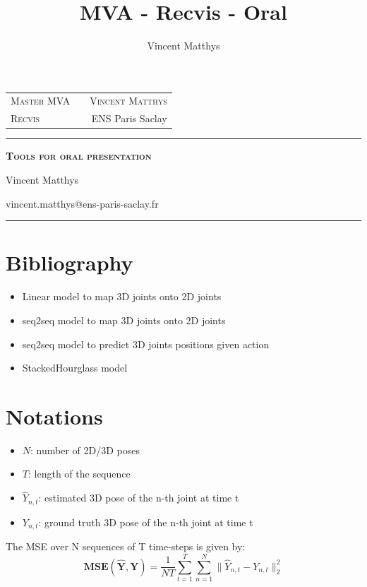 \documentclass[12pt,a4paper,onecolumn]{article}
\title{MVA - Recvis - Oral}
\author{Vincent Matthys}
\begin{document}
\begin{tabularx}{0.9\textwidth}{@{} l X r @{} }
	{\textsc{Master MVA}}  &  & \textsc{Vincent Matthys} \\
	\textsc{Recvis} &  & {ENS Paris Saclay}       \\
\end{tabularx}
\vspace{1.5cm}
\begin{center}

	\rule[11pt]{5cm}{0.5pt}

	\textbf{\LARGE \textsc{Tools for oral presentation}}
	\vspace{0.5cm}

	Vincent Matthys

	vincent.matthys@ens-paris-saclay.fr

	\rule{5cm}{0.5pt}

	\vspace{1.5cm}
\end{center}

\section{Bibliography}
\begin{itemize}
	\item Linear model to map 3D joints onto 2D joints~\cite{martinez2017simple}
	\item seq2seq model to map 3D joints onto 2D joints~\cite{hossain2017exploiting}
	\item seq2seq model to predict 3D joints positions given action~\cite{martinez2017human}
	\item StackedHourglass model~\cite{newell2016}
\end{itemize}

\section{Notations}
\begin{itemize}
	\item \(N\): number of 2D/3D poses
	\item \(T\): length of the sequence
	\item \(\widehat{Y}_{n,t}\): estimated 3D pose of the n-th joint at time t
	\item \(Y_{n,t}\): ground truth 3D pose of the n-th joint at time t
\end{itemize}



The MSE over N sequences of T time-steps is given by:
\begin{equation}
	\bm{MSE}(\widehat{\bm{Y}}, \bm{Y}) = \frac{1}{NT}\sum_{t = 1}^T\sum_{n = 1}^N \rVert \widehat{Y}_{n,t} - Y_{n,t} \lVert_2^2
\end{equation}
\end{document}

